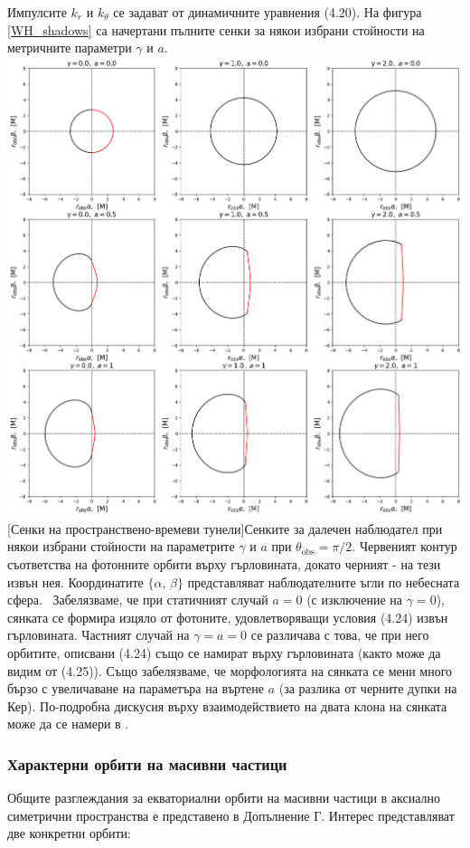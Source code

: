Импулсите $k_r$ и $k_\theta$ се задават от динамичните уравнения (4.20). На фигура \ref{WH_shadows} са начертани пълните сенки за някои избрани стойности на метричните параметри $\gamma$ и $a$.\\

\includegraphics[scale = 0.37]{WH_Shadows.png}
[Сенки на пространствено-времеви тунели]{\small Сенките за далечен наблюдател при някои избрани стойности на параметрите $\gamma$ и $a$ при $\theta_\text{obs} = \pi / 2$. Червеният контур съответства на фотонните орбити върху гърловината, докато черният - на тези извън нея. Координатите $\{\alpha,\,\beta\}$ представляват наблюдателните ъгли по небесната сфера.}
\label{WH_shadows}
$\,$
\newline
Забелязваме, че при статичният случай $a = 0$ (с изключение на $\gamma = 0$), сянката се формира изцяло от фотоните, удовлетворяващи условия (4.24) извън гърловината. Частният случай на $\gamma = a = 0$ се различава с това, че при него орбитите, описвани (4.24) също се намират върху гърловината (както може да видим от (4.25)). Също забелязваме, че морфологията на сянката се мени много бързо с увеличаване на параметъра на въртене $a$ (за разлика от черните дупки на Кер). По-подробна дискусия върху взаимодействието на двата клона на сянката може да се намери в \cite{Gyulchev2018}.
\newpage
\subsubsection{Характерни орбити на масивни частици}
Общите разглеждания за екваториални орбити на масивни частици в аксиално симетрични пространства е представено в Допълнение Г. Интерес представляват две конкретни орбити:\\

